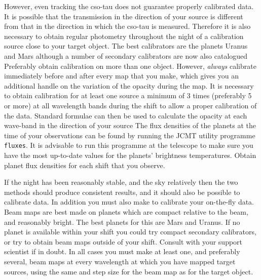    However, even tracking the cso-tau does not guarantee properly
   calibrated data. It is possible that the transmission in the
   direction of your source is different from that in the direction in
   which the cso-tau is measured. Therefore it is also necessary to
   obtain regular photometry throughout the night of a calibration
   source close to your target object. The best calibrators are the
   planets Uranus and Mars
   although a number of secondary calibrators are now also catalogued
   Preferably obtain calibration on more than one object. However,
   {\em always\/} calibrate immediately before and after every
   map that you make, which gives you an additional handle on the
   variation of the opacity during the map. It is necessary to obtain
   calibration for
   at least one source a minimum of 3 times (preferably 5 or more) at
   all wavelength bands during the shift to allow a proper calibration
   of the data. Standard formulae can then be used to calculate the
   opacity at each wave-band in the direction of your source
   The flux densities of the planets at the time of
   your observations can be
   found by running the JCMT utility programme {\tt fluxes}. It is
   advisable to run this programme at the telescope to make sure you
   have the most up-to-date values for the planets' brightness
   temperatures. Obtain planet flux densities for each shift that you
   observe.

   If the night has been reasonably stable, and the sky relatively
   then the two methods should produce consistent results, and it should
   also be possible to calibrate
   data. In addition you must also make
   to calibrate your on-the-fly data. Beam maps are best made on planets
   which are compact relative to the beam, and reasonably bright. The
   best planets for this are Mars and Uranus. If no planet is available
   within your shift you could try compact secondary calibrators, or try
   to obtain beam maps outside of your shift. Consult with your support
   scientist if in doubt. In all cases you must make at least one, and
   preferably several, beam maps at every wavelength at which you have
   mapped target sources, using the same
   and step size for the beam map as for the target object.

